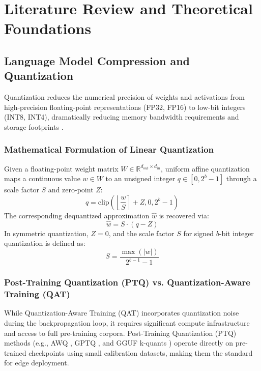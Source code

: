 \documentclass[12pt,a4paper,oneside]{report}
\begin{document}
\newpage
\chapter{Literature Review and Theoretical Foundations}

\section{Language Model Compression and Quantization}
Quantization reduces the numerical precision of weights and activations from high-precision floating-point representations (FP32, FP16) to low-bit integers (INT8, INT4), dramatically reducing memory bandwidth requirements and storage footprints \cite{dettmers2022llmint8}.

\subsection{Mathematical Formulation of Linear Quantization}
Given a floating-point weight matrix $W \in \mathbb{R}^{d_{out} \times d_{in}}$, uniform affine quantization maps a continuous value $w \in W$ to an unsigned integer $q \in [0, 2^b - 1]$ through a scale factor $S$ and zero-point $Z$:
\begin{equation}
    q = \text{clip}\left(\left\lfloor \frac{w}{S} \right\rceil + Z, 0, 2^b - 1\right)
\end{equation}
The corresponding dequantized approximation $\hat{w}$ is recovered via:
\begin{equation}
    \hat{w} = S \cdot (q - Z)
\end{equation}
In symmetric quantization, $Z = 0$, and the scale factor $S$ for signed $b$-bit integer quantization is defined as:
\begin{equation}
    S = \frac{\max(|w|)}{2^{b-1} - 1}
\end{equation}

\subsection{Post-Training Quantization (PTQ) vs. Quantization-Aware Training (QAT)}
While Quantization-Aware Training (QAT) incorporates quantization noise during the backpropagation loop, it requires significant compute infrastructure and access to full pre-training corpora. Post-Training Quantization (PTQ) methods (e.g., AWQ \cite{lin2023awq}, GPTQ \cite{frantar2022gptq}, and GGUF k-quants \cite{gerganov2023llamacpp}) operate directly on pre-trained checkpoints using small calibration datasets, making them the standard for edge deployment.
\end{document}
